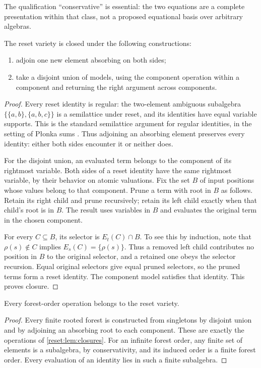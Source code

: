 The qualification ``conservative'' is essential: the two equations are
a complete presentation within that class, not a proposed equational
basis over arbitrary algebras.

\begin{lemma}\label{reset:lem:closures}
The reset variety is closed under the following constructions:
\begin{enumerate}
\item adjoin one new element absorbing on both sides;
\item take a disjoint union of models, using the component operation
within a component and returning the right argument across components.
\end{enumerate}
\end{lemma}
\begin{proof}
Every reset identity is regular: the two-element ambiguous subalgebra
$\{\{a,b\},\{a,b,c\}\}$ is a semilattice under reset, and its identities
have equal variable supports. This is the standard semilattice argument
for regular identities, in the setting of P{\l}onka sums
\cite{Plonka1967}.
Thus adjoining an absorbing element preserves every identity: either
both sides encounter it or neither does.

For the disjoint union, an evaluated term belongs to the component of
its rightmost variable. Both sides of a reset identity have the same
rightmost variable, by their behavior on atomic valuations. Fix the
set $B$ of input positions whose values belong to that component.
Prune a term with root in $B$ as follows. Retain its right child and
prune recursively; retain its left child exactly when that child's
root is in $B$. The result uses variables in $B$ and evaluates the
original term in the chosen component.

For every $C\subseteq B$, its selector is $E_t(C)\cap B$.
To see this by induction, note that $\rho(s)\notin C$ implies
$E_s(C)=\{\rho(s)\}$. Thus a removed left child contributes no
position in $B$ to the original selector, and a retained one obeys the
selector recursion. Equal original selectors give equal pruned selectors,
so the pruned terms form a reset identity. The component model satisfies
that identity. This proves closure.
\end{proof}

\begin{lemma}\label{reset:lem:forest-membership}
Every forest-order operation belongs to the reset variety.
\end{lemma}
\begin{proof}
Every finite rooted forest is constructed from singletons by disjoint
union and by adjoining an absorbing root to each component. These are
exactly the operations of \cref{reset:lem:closures}.
For an infinite forest order, any finite set of elements is a subalgebra,
by conservativity, and its induced order is a finite forest order.
Every evaluation of an identity lies in such a finite subalgebra.
\end{proof}

